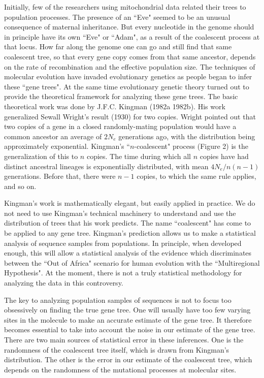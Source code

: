 \documentclass[12pt]{article}
\begin{document}
Initially, few of the researchers using mitochondrial data related their
trees to population processes.  The presence of an ``Eve" seemed to be an
unusual consequence of maternal inheritance.  But every nucleotide
in the genome should in principle have its own ``Eve" or ``Adam", as a
result of the coalescent process at that locus.  How far along the genome
one can go and still find that same coalescent tree, so that
every gene copy comes from that same ancestor, depends on the rate of recombination and
the effective population size.   The techniques of molecular evolution
have invaded evolutionary genetics as people began to infer these ``gene
trees".  At the same time evolutionary genetic theory turned out to
provide the theoretical framework for analyzing these gene trees.   The
basic theoretical work was done by J.F.C. Kingman (1982a 1982b).  His work
generalized Sewall Wright's result (1930) for two copies.  Wright pointed
out that two copies of a gene in a closed randomly-mating population would have
a common ancestor an average of $2N_e$ generations ago, with the
distribution being approximately exponential.  Kingman's ``$n$-coalescent"
process (Figure 2) is the generalization of this to $n$ copies.  The time during which all
$n$ copies have had distinct ancestral lineages is exponentially
distributed, with mean $4N_e/n(n-1)$ generations.  Before that, there were
$n-1$ copies, to which the same rule applies, and so on.

Kingman's work is mathematically elegant, but easily applied in practice.  We
do not need to use Kingman's technical machinery to understand and use the
distribution of trees that his work predicts.  The name ``coalescent" has come
to be applied to any gene tree.  Kingman's prediction allows us to make a
statistical analysis of sequence samples from populations.  In principle, when
developed enough, this will allow a statistical analysis of the evidence
which discriminates between the ``Out of Africa" scenario for human
evolution with the ``Multiregional Hypothesis".  At the moment, there is not
a truly statistical methodology for analyzing the data in this controversy.

The key to analyzing population samples of sequences is not to focus too
obsessively on finding the true gene tree.  One will usually have too few
varying sites in the molecule to make an accurate estimate of the gene tree.
It therefore becomes essential to take into account the noise in our
estimate of the gene tree.   There are two main sources of statistical error
in these inferences.  One is the randomness of the coalescent tree itself,
which is drawn from Kingman's distribution.  The other is the error in our
estimate of the coalescent tree, which depends on the randomness of the
mutational processes at molecular sites.
\end{document}
